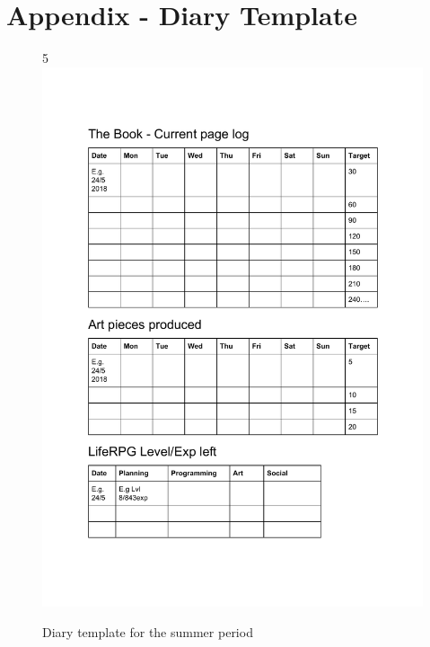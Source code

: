 \documentclass{scrartcl}
\begin{document}
\section{Appendix - Diary Template}
\begin{figure}[h]5
	\centering
	\includegraphics[width=0.7\linewidth]{diary.pdf}
	\caption{Diary template for the summer period}
\end{figure}
\end{document}
